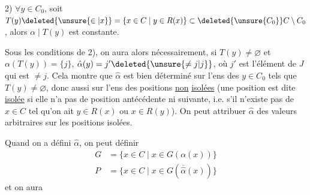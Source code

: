 2) $\forall y\in C_0$, soit $T(y)\deleted{\unsure{\in|x}}=\{x\in C\mid y\in R(x)\}\subset\deleted{\unsure{C_0}}C\setminus C_0$, alors $\alpha\mid T(y)$ est constante.

Sous les conditions de 2), on aura alors nécessairement, si $T(y)\ne\varnothing$ et $\alpha(T(y))=\{j\}$, $\hat\alpha(y)=j'\deleted{\unsure{\ne j|j}}$, où $j'$ est l'élément de $J$ qui est $\ne j$. Cela montre que $\hat\alpha$ est bien déterminé sur l'ens  des $y\in C_0$ tels que $T(y)\ne\varnothing$, donc aussi sur l'ens des positions \uline{non} \uline{isolées} (une position  est dite \uline{isolée} si elle n'a pas de position antécédente ni suivante, i.e. s'il n'existe pas de $x\in C$ tel qu'on ait $y\in R(x)$ ou $x\in R(y)$). On peut attribuer  $\hat\alpha$ des valeurs arbitraires sur les positions isolées.

Quand on a défini  $\hat\alpha$, on peut définir
\[
 \begin{aligned}
 G&=\{x\in C\mid x\in G(\alpha(x))\}\\
 P&=\{x\in C\mid x\in G(\overline{\hat\alpha}(x))\}
 \end{aligned}
\]
et on  aura
